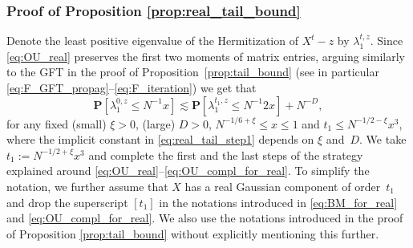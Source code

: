 \documentclass[10pt]{amsart}
\numberwithin{equation}{section}
\begin{document}
\subsubsection{Proof of Proposition \ref{prop:real_tail_bound}}  
Denote the least positive eigenvalue of the Hermitization of $X^{t}-z$ by $\lambda_1^{t,z}$. Since \eqref{eq:OU_real} preserves the first two moments of matrix entries, arguing similarly to the GFT in the proof of Proposition~\ref{prop:tail_bound} (see in particular \eqref{eq:F_GFT_propag}--\eqref{eq:F_iteration}) we get that 
\begin{equation}
\mathbf{P}[\lambda^{0,z}_{1}\le N^{-1}x] \lesssim \mathbf{P}[\lambda^{t_1,z}_1\le N^{-1}2x]+N^{-D},
\label{eq:real_tail_step1}
\end{equation}
for any fixed (small) $\xi>0$, (large) $D>0$, $N^{-1/6+\xi}\le x\le 1$ and $t_1\le N^{-1/2-\xi}x^3$, where the implicit constant in \eqref{eq:real_tail_step1} depends on $\xi$ and~$D$. We take $t_1:=N^{-1/2+\xi}x^3$ and complete the first and the last steps of the strategy explained around \eqref{eq:OU_real}--\eqref{eq:OU_compl_for_real}. To simplify the notation, we further assume that $X$ has a real Gaussian component of order~$t_1$ and drop the superscript $[t_1]$ in the notations introduced in \eqref{eq:BM_for_real} and \eqref{eq:OU_compl_for_real}. We also use the notations introduced in the proof of Proposition \ref{prop:tail_bound} without explicitly mentioning this further.
\end{document}
